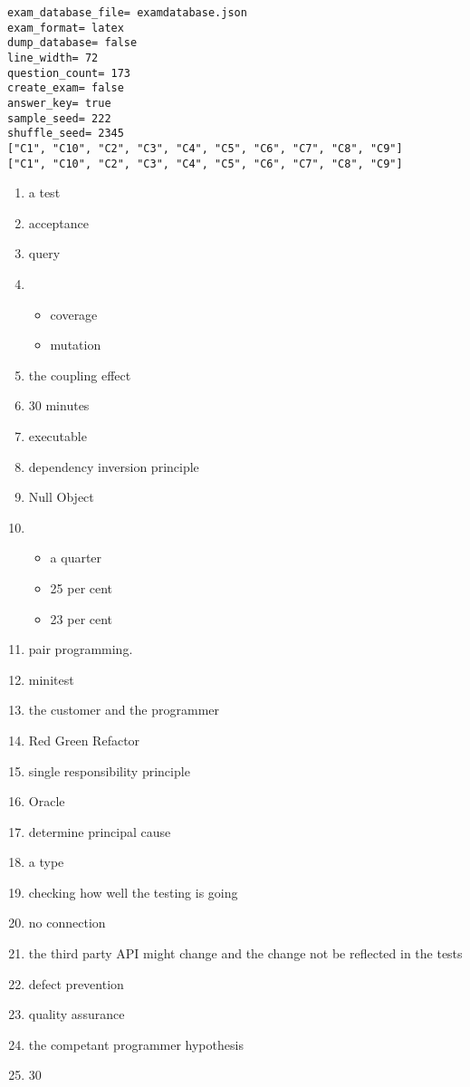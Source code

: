 \documentclass{exam}
\begin{document}
\newpage
\begin{verbatim}
exam_database_file= examdatabase.json
exam_format= latex
dump_database= false
line_width= 72
question_count= 173
create_exam= false
answer_key= true
sample_seed= 222
shuffle_seed= 2345
["C1", "C10", "C2", "C3", "C4", "C5", "C6", "C7", "C8", "C9"]
["C1", "C10", "C2", "C3", "C4", "C5", "C6", "C7", "C8", "C9"]
\end{verbatim}
\begin{enumerate}
\item a test
\item acceptance
\item query
\item \begin{itemize}
\item coverage
\item mutation
\end{itemize}
\item the coupling effect
\item 30 minutes
\item executable
\item dependency inversion principle
\item Null Object
\item \begin{itemize}
\item a quarter
\item 25 per cent
\item 23 per cent
\end{itemize}
\item pair programming.
\item minitest
\item the customer and the programmer
\item Red Green Refactor
\item single responsibility principle
\item Oracle
\item determine principal cause
\item a type
\item checking how well the testing is going
\item no connection
\item the third party API might change and the change not be reflected in the tests
\item defect prevention
\item quality assurance
\item the competant programmer hypothesis
\item 30

\end{enumerate}
\end{document}
